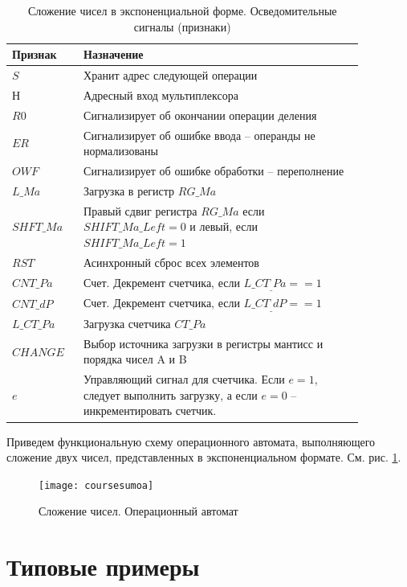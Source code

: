 \documentclass[a4paper,14pt]{extarticle}
\begin{document}
\begin{table}[h!]
	\centering
	\small
	\begin{tabular}{|m{0.17\linewidth}|m{0.7\linewidth}|}
		\hline
		\textbf{Признак} & \textbf{Назначение} \\ \hline
		$S$ & Хранит адрес следующей операции \\ \hline
		$Н$ & Адресный вход мультиплексора \\ \hline
		$R0$ & Сигнализирует об окончании операции деления \\ \hline
		$ER$ & Сигнализирует об ошибке ввода -- операнды не нормализованы \\ \hline
		$OWF$ & Сигнализирует об ошибке обработки -- переполнение \\ \hline
		$L\_Ma$ & Загрузка в регистр $RG\_Ma$ \\ \hline
		$SHFT\_Ma$ & Правый сдвиг регистра $RG\_Ma$ если $SHIFT\_Ma\_Left=0$ и левый, если  $SHIFT\_Ma\_Left=1$ \\ \hline
		$RST$ & Асинхронный сброс всех элементов \\ \hline
		$CNT\_Pa$ & Счет. Декремент счетчика, если $L\_CT_\_Pa==1$ \\ \hline
		$CNT\_dP$ & Счет. Декремент счетчика, если $L\_CT_\_dP==1$ \\ \hline
		$L\_CT\_Pa$ & Загрузка счетчика $CT\_Pa$ \\ \hline
		$CHANGE$ & Выбор источника загрузки в регистры мантисс и порядка чисел A и B \\ \hline
		$e$ & Управляющий сигнал для счетчика. Если $e=1$, следует выполнить загрузку, а если $e=0$ -- инкрементировать счетчик. \\ \hline
	\end{tabular}
	\caption{Сложение чисел в экспоненциальной форме. Осведомительные сигналы (признаки)}
	\label{tab:signalsop2}
\end{table}
\normalsize
Приведем функциональную схему операционного автомата, выполняющего сложение двух чисел, представленных в экспоненциальном формате. См. рис. \ref{fig:courseoperationautomat2}.
\begin{figure}[htpb]
	\centering
	\texttt{[image: coursesumoa]}
	\caption{Сложение чисел. Операционный автомат}
	\label{fig:courseoperationautomat2}
\end{figure}

\newpage
\newpage
\section{Типовые примеры}
\end{document}
